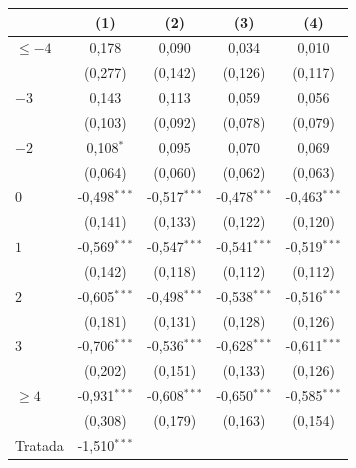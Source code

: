 \begingroup
\centering
\begin{tabular}{lcccc}
   \toprule
                          & (1)            & (2)            & (3)            & (4)\\  
   \midrule 
   $\leq -4$              & 0{,}178          & 0{,}090          & 0{,}034          & 0{,}010\\   
                          & (0{,}277)        & (0{,}142)        & (0{,}126)        & (0{,}117)\\   
   $-3$                   & 0{,}143          & 0{,}113          & 0{,}059          & 0{,}056\\   
                          & (0{,}103)        & (0{,}092)        & (0{,}078)        & (0{,}079)\\   
   $-2$                   & 0{,}108$^{*}$    & 0{,}095          & 0{,}070          & 0{,}069\\   
                          & (0{,}064)        & (0{,}060)        & (0{,}062)        & (0{,}063)\\   
   $0$                    & -0{,}498$^{***}$ & -0{,}517$^{***}$ & -0{,}478$^{***}$ & -0{,}463$^{***}$\\   
                          & (0{,}141)        & (0{,}133)        & (0{,}122)        & (0{,}120)\\   
   $1$                    & -0{,}569$^{***}$ & -0{,}547$^{***}$ & -0{,}541$^{***}$ & -0{,}519$^{***}$\\   
                          & (0{,}142)        & (0{,}118)        & (0{,}112)        & (0{,}112)\\   
   $2$                    & -0{,}605$^{***}$ & -0{,}498$^{***}$ & -0{,}538$^{***}$ & -0{,}516$^{***}$\\   
                          & (0{,}181)        & (0{,}131)        & (0{,}128)        & (0{,}126)\\   
   $3$                    & -0{,}706$^{***}$ & -0{,}536$^{***}$ & -0{,}628$^{***}$ & -0{,}611$^{***}$\\   
                          & (0{,}202)        & (0{,}151)        & (0{,}133)        & (0{,}126)\\   
   $\geq 4$               & -0{,}931$^{***}$ & -0{,}608$^{***}$ & -0{,}650$^{***}$ & -0{,}585$^{***}$\\   
                          & (0{,}308)        & (0{,}179)        & (0{,}163)        & (0{,}154)\\   
   Tratada                & -1{,}510$^{***}$ &                &                &   \\   

\end{tabular}
